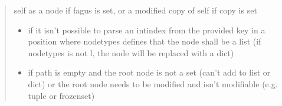 \documentclass[a4paper,10pt,english]{sphinxmanual}
\begin{document}
\begin{fulllineitems}
\begin{fulllineitems}
\begin{quote}
\begin{description}
\begin{itemize}
\end{itemize}

\sphinxAtStartPar
self as a node if fagus is set, or a modified copy of self if copy is set

\begin{itemize}
\item {}
\sphinxAtStartPar
{} \textendash{} if it isn’t possible to parse an int\sphinxhyphen{}index from the provided key in a position where node\sphinxhyphen{}types
    defines that the node shall be a list (if node\sphinxhyphen{}types is not l, the node will be replaced with a dict)

\item {}
\sphinxAtStartPar
{} \textendash{} if path is empty and the root node is not a set (can’t add to list or dict) or the root node
    needs to be modified and isn’t modifiable (e.g. tuple or frozenset)

\end{itemize}

\end{description}\end{quote}

\end{fulllineitems}



\end{fulllineitems}
\end{document}

